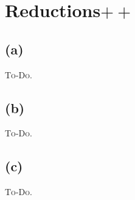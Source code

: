

\setcounter{section}{1}


\section{Reductions$++$}

\subsection{(a)}

\textsc{To-Do.}

\subsection{(b)}

\textsc{To-Do.}

\subsection{(c)}

\textsc{To-Do.}


